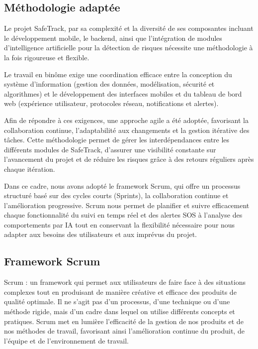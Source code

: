\subsection{Méthodologie adaptée}

Le projet SafeTrack, par sa complexité et la diversité de ses composantes incluant le développement mobile, le backend, ainsi que l'intégration de modules d'intelligence artificielle pour la détection de risques nécessite une méthodologie à la fois rigoureuse et flexible.

Le travail en binôme exige une coordination efficace entre la conception du système d'information (gestion des données, modélisation, sécurité et algorithmes) et le développement des interfaces mobiles et du tableau de bord web (expérience utilisateur, protocoles réseau, notifications et alertes).

Afin de répondre à ces exigences, une approche agile a été adoptée, favorisant la collaboration continue, l'adaptabilité aux changements et la gestion itérative des tâches. Cette méthodologie permet de gérer les interdépendances entre les différents modules de SafeTrack, d'assurer une visibilité constante sur l'avancement du projet et de réduire les risques grâce à des retours réguliers après chaque itération.

Dans ce cadre, nous avons adopté le framework Scrum, qui offre un processus structuré basé sur des cycles courts (Sprints), la collaboration continue et l'amélioration progressive. Scrum nous permet de planifier et suivre efficacement chaque fonctionnalité du suivi en temps réel et des alertes SOS à l'analyse des comportements par IA tout en conservant la flexibilité nécessaire pour nous adapter aux besoins des utilisateurs et aux imprévus du projet.
\subsection{Framework Scrum}
Scrum \cite{scrumguide} : un framework qui permet aux utilisateurs de faire face à des situations complexes tout en produisant de manière créative et efficace des produits de qualité optimale. Il ne s'agit pas d'un processus, d'une technique ou d'une méthode rigide, mais d'un cadre dans lequel on utilise différents concepts et pratiques. Scrum met en lumière l'efficacité de la gestion de nos produits et de nos méthodes de travail, favorisant ainsi l'amélioration continue du produit, de l'équipe et de l'environnement de travail. \\

